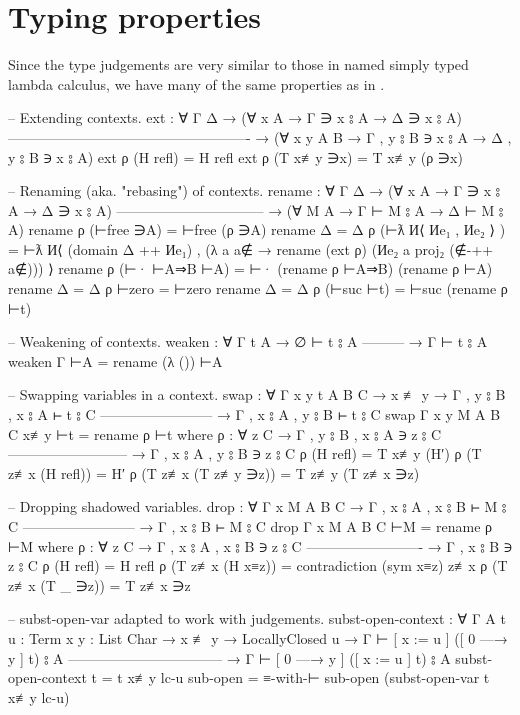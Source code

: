 \section{Typing properties}
Since the type judgements are very similar to those in named simply typed lambda calculus,
we have many of the same properties as in \citet[chapter~Lambda]{wadler_programming_2022}.
\begin{code}
  -- Extending contexts.
  ext : ∀ {Γ Δ}
    → (∀ {x A}     →         Γ ∋ x ⦂ A →         Δ ∋ x ⦂ A)
      ----------------------------------------------------
    → (∀ {x y A B} → Γ , y ⦂ B ∋ x ⦂ A → Δ , y ⦂ B ∋ x ⦂ A)
  ext ρ (H refl) = H refl
  ext ρ (T x≢y ∋x) = T x≢y (ρ ∋x)

  -- Renaming (aka. "rebasing") of contexts.
  rename : ∀ {Γ Δ}
    → (∀ {x A} → Γ ∋ x ⦂ A → Δ ∋ x ⦂ A)
      --------------------------------
    → (∀ {M A} → Γ ⊢ M ⦂ A → Δ ⊢ M ⦂ A)
  rename ρ (⊢free ∋A) = ⊢free (ρ ∋A)
  rename {Δ = Δ} ρ (⊢ƛ И⟨ Иe₁ , Иe₂ ⟩ ) =
    ⊢ƛ И⟨ (domain Δ ++ Иe₁) , (λ a {a∉} →
      rename (ext ρ) (Иe₂ a {proj₂ (∉-++ a∉)})) ⟩
  rename ρ (⊢· ⊢A⇒B ⊢A) = ⊢· (rename ρ ⊢A⇒B) (rename ρ ⊢A)
  rename {Δ = Δ} ρ ⊢zero = ⊢zero
  rename {Δ = Δ} ρ (⊢suc ⊢t) = ⊢suc (rename ρ ⊢t)

  -- Weakening of contexts.
  weaken : ∀ {Γ t A}
    → ∅ ⊢ t ⦂ A
      ---------
    → Γ ⊢ t ⦂ A
  weaken {Γ} ⊢A = rename (λ ()) ⊢A

  -- Swapping variables in a context.
  swap : ∀ {Γ x y t A B C}
    → x ≢ y
    → Γ , y ⦂ B , x ⦂ A ⊢ t ⦂ C
      ------------------------
    → Γ , x ⦂ A , y ⦂ B ⊢ t ⦂ C
  swap {Γ} {x} {y} {M} {A} {B} {C} x≢y ⊢t = rename ρ ⊢t
    where
      ρ : ∀ {z C}
        → Γ , y ⦂ B , x ⦂ A ∋ z ⦂ C
          --------------------------
        → Γ , x ⦂ A , y ⦂ B ∋ z ⦂ C
      ρ (H refl) = T x≢y (H′)
      ρ (T z≢x (H refl)) = H′
      ρ (T z≢x (T z≢y ∋z)) = T z≢y (T z≢x ∋z)

  -- Dropping shadowed variables.
  drop : ∀ {Γ x M A B C}
    → Γ , x ⦂ A , x ⦂ B ⊢ M ⦂ C
      ------------------------
    → Γ , x ⦂ B ⊢ M ⦂ C
  drop {Γ} {x} {M} {A} {B} {C} ⊢M = rename ρ ⊢M
    where
      ρ : ∀ {z C}
        → Γ , x ⦂ A , x ⦂ B ∋ z ⦂ C
          -------------------------
        → Γ , x ⦂ B ∋ z ⦂ C
      ρ (H refl) = H refl
      ρ (T z≢x (H x≡z)) = contradiction (sym x≡z) z≢x
      ρ (T z≢x (T _ ∋z)) = T z≢x ∋z

  -- subst-open-var adapted to work with judgements.
  subst-open-context : ∀ {Γ A} {t u : Term} {x y : List Char}
    → x ≢ y
    → LocallyClosed u
    → Γ ⊢ [ x := u ] ([ 0 —→ y ] t) ⦂ A
      ---------------------------------
    → Γ ⊢ [ 0 —→ y ] ([ x := u ] t) ⦂ A
  subst-open-context {t = t} x≢y lc-u sub-open =
    ≡-with-⊢ sub-open (subst-open-var t x≢y lc-u)
\end{code}

